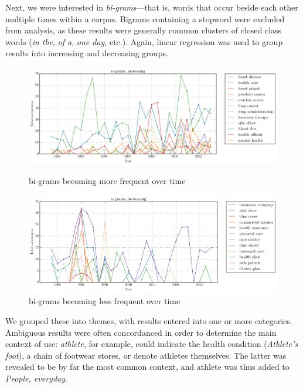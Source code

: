     Next, we were interested in \emph{bi-grams}---that is, words that occur beside each other multiple times within a corpus. Bigrams containing a stopword were excluded from analysis, as these results were generally common clusters of closed class words (\emph{in the}, \emph{of a}, \emph{one day}, etc.). Again, linear regression was used to group results into increasing and decreasing groups.

    \noindent
    \begin{figure}[htb!]
    \centering
    \begin{minipage}{.45\textwidth}
    \centering
    \includegraphics[width=.95\textwidth]{../images/ngrams-increasing.png}
    \caption{bi-grams becoming more frequent over time}
    \label{fig:ngram-inc}
    \end{minipage}%
    \begin{minipage}{.55\textwidth}
    \centering
    \includegraphics[width=.95\textwidth]{../images/ngrams-decreasing.png}
    \caption{bi-grams becoming less frequent over time}
    \label{fig:ngram-dec}
    \end{minipage}
    \end{figure}

We grouped these into themes, with results entered into one or more categories. Ambiguous results were often concordanced in order to determine the main context of use: \emph{athlete}, for example, could indicate the health condition (\emph{Athlete's foot}), a chain of footwear stores, or denote athletes themselves. The latter was revealed to be by far the most common context, and athlete was thus added to \emph{People, everyday}.


